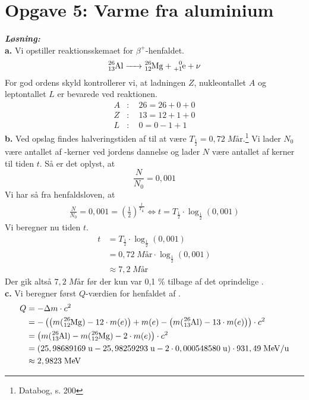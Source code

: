 \documentclass{report}
\newcommand{\sol}{\setlength{\parindent}{0cm}\textbf{\textit{Løsning:}}\setlength{\parindent}{1cm}}
\begin{document}
\section*{Opgave 5: Varme fra aluminium}
\sol \\
\textbf{a.}
Vi opstiller reaktionsskemaet for $\beta ^+$-henfaldet.
\[
\ce{^26_13Al -> ^26_12Mg + ^0_{+1}e + \nu} 
\] 
For god ordens skyld kontrollerer vi, at ladningen $Z$, nukleontallet $A$ og leptontallet $L$ er bevarede ved reaktionen. 
\begin{equation*}
\begin{split}
  A&: \quad 26 = 26 + 0 + 0 \\
  Z&:\quad 13 = 12 + 1 + 0 \\
  L&:\quad 0 = 0 -1 +1
\end{split}
\end{equation*}
\textbf{b.}
Ved opslag findes halveringstiden af  til at være $T _{\frac{1}{2}}=0,72 \;\unit{M} \text{år}  $.\footnote{Databog, s. 200}
Vi lader $N _{0}$ være antallet af -kerner ved jordens dannelse og lader $N$ være antallet af kerner til tiden $t$. 
Så er det oplyst, at
\[
\frac{N}{N _{0}}=0,001
\] 
Vi har så fra henfaldsloven, at
\begin{equation*}
\begin{split}
  \frac{N}{N _{0}}=0,001 = \left(\frac{1}{2}\right) ^{\frac{t}{T _{\frac{1}{2}}}} \iff t = T _{\frac{1}{2}} \cdot \log_{\frac{1}{2}}\left(0,001\right) 
\end{split}
\end{equation*}
Vi beregner nu tiden $t$.
\begin{equation*}
\begin{split}
  t &= T _{\frac{1}{2}} \cdot \log_{\frac{1}{2}}\left(0,001\right)\\
  &=0,72 \;\unit{M} \text{år} \cdot \log_{\frac{1}{2}}\left(0,001\right)\\
  &\approx 7,2 \;\unit{M} \text{år}
\end{split}
\end{equation*}
Der gik altså $7,2 \;\unit{M} \text{år}$ før der kun var 0,1 \% tilbage af det oprindelige .\\[1ex]
\textbf{c.}
Vi beregner først $Q$-værdien for henfaldet af .
\begin{equation*}
\begin{split}
  Q&=-\Delta m \cdot c^2 \\
  &=-\left(\left( m(\ce{^26_12Mg} ) - 12 \cdot m(e)\right) + m(e) - \left(m(\ce{^26_13Al} ) - 13 \cdot m(e)\right) \right) \cdot c^2\\
  &=\left( m(\ce{^26_13Al} ) - m(\ce{^26_12Mg} ) - 2 \cdot m(e)\right) \cdot c^2\\
  &=\left(25,98689169 \;\unit{u} - 25,98259293 \;\unit{u} - 2 \cdot 0,000548580 \;\unit{u} \right) \cdot 931,49 \;\unit{MeV/u} \\
  &\approx 2,9823 \;\unit{MeV} 
\end{split}
\end{equation*}
\end{document}
